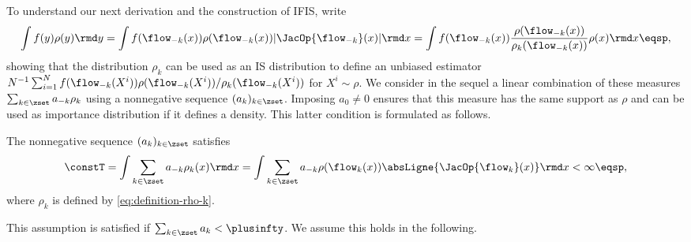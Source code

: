 
To understand our next derivation and the construction of IFIS, write
\[
\int f(y) \rho(y) \rmd y =
\int f(\flow_{-k}(x)) \rho(\flow_{-k}(x)) |\JacOp{\flow_{-k}}(x)|\rmd x =
\int f(\flow_{-k}(x)) \frac{\rho(\flow_{-k}(x))}{\rho_k(\flow_{-k}(x))} \rho(x) \rmd x \eqsp,
\]
showing that the distribution $\rho_k$ can be used as an IS distribution to define an unbiased estimator
$N^{-1}\sum_{i=1}^N f(\flow_{-k}(X^i))\rho(\flow_{-k}(X^i))/
\rho_k(\flow_{-k}(X^i))$  for $X^i\sim \rho$. %
We consider in the sequel a linear combination of these measures $\sum_{k\in\zset} a_{-k} \rho_k$ using a nonnegative sequence $(a_k)_{k \in\zset}$. Imposing $a_0 \neq 0$ ensures that this measure has the same support as $\rho$ and can be used as importance distribution if it defines a density. This latter condition is formulated as follows. 
\begin{assumption}
  \label{assumption:z_ne_finite}
  The nonnegative sequence $(a_k)_{k\in\zset}$ satisfies
\begin{equation}
\label{eq:def_z_ne}
    \constT = \int\sum_{k\in \zset}  a_{-k} \rho_k(x) \rmd x = \int\sum_{k\in \zset}  a_{-k} \rho(\flow_k(x))  \absLigne{\JacOp{\flow_k}(x)} \rmd x< \infty\eqsp,
  \end{equation}
    where $\rho_k$ is defined by \eqref{eq:definition-rho-k}.
  \end{assumption}
This assumption is satisfied if $\sum_{k \in\zset} a_k < \plusinfty$. We assume this holds in the following. 
  
